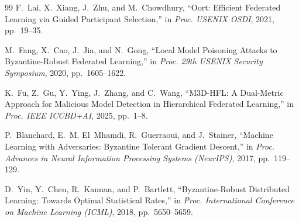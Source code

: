 \documentclass[conference]{IEEEtran}
\begin{document}
\begin{thebibliography}{99}
F.~Lai, X.~Xiang, J.~Zhu, and M.~Chowdhury,
``Oort: Efficient Federated Learning via Guided Participant Selection,''
in \emph{Proc. USENIX OSDI}, 2021, pp.~19--35.

M.~Fang, X.~Cao, J.~Jia, and N.~Gong,
``Local Model Poisoning Attacks to Byzantine-Robust Federated Learning,''
in \emph{Proc. 29th USENIX Security Symposium}, 2020, pp.~1605--1622.

K.~Fu, Z.~Gu, Y.~Ying, J.~Zhang, and C.~Wang,
``M3D-HFL: A Dual-Metric Approach for Malicious Model Detection in Hierarchical Federated Learning,''
in \emph{Proc. IEEE ICCBD+AI}, 2025, pp.~1--8.

P.~Blanchard, E.~M. El~Mhamdi, R.~Guerraoui, and J.~Stainer,
``Machine Learning with Adversaries: Byzantine Tolerant Gradient Descent,''
in \emph{Proc. Advances in Neural Information Processing Systems (NeurIPS)}, 2017, pp.~119--129.

D.~Yin, Y.~Chen, R.~Kannan, and P.~Bartlett,
``Byzantine-Robust Distributed Learning: Towards Optimal Statistical Rates,''
in \emph{Proc. International Conference on Machine Learning (ICML)}, 2018, pp.~5650--5659.

\end{thebibliography}
\end{document}
